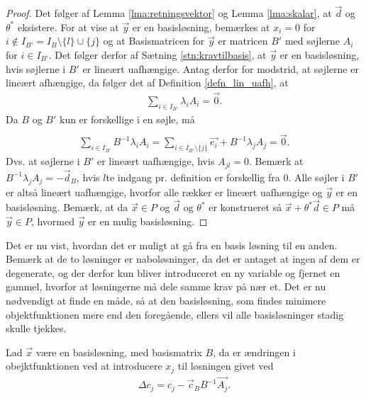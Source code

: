 \begin{proof}
Det følger af Lemma \ref{lma:retningsvektor} og Lemma \ref{lma:skalar}, at $\vec{d}$ og $\theta^*$ eksistere. 
For at vise at $\vec{y}$ er en basisløsning, bemærkes at $x_i = 0$ for $i \notin I_{B'} = I_B\setminus\{l\}\cup\{j\}$ og at Basismatricen for $\vec{y}$ er matricen $B'$ med søjlerne $A_i$ for $i \in I_{B'}$. 
Det følger derfor af Sætning \ref{stn:kravtilbasis},
at $\vec{y}$ er en basisløsning, hvis søjlerne i $B'$ er lineært uafhængige.
Antag derfor for modstrid, at søjlerne er lineært afhængige, da følger det af Definition \ref{defn_lin_uafh},
at
\begin{align*}
 \sum_{i \in I_{B'}} \lambda_i A_i = \vec{0}.
\end{align*}
Da $B$ og $B'$ kun er forskellige i en søjle, må
\begin{align*}
 \\ \sum_{i \in I_{B'}}  B^{-1} \lambda_i A_i  =\sum_{i \in I_{B'}\setminus \{j\}} \vec{e_i} + B^{-1} \lambda_j A_j = \vec{0}.
\end{align*}
Dvs. at søjlerne i $B'$ er lineært uafhængige, hvis $A_{jl} = 0$.
Bemærk at $B^{-1} \lambda_j A_j = - \vec{d}_B$, hvis $l$te indgang pr. definition er forskellig fra $0$. 
Alle søjler i $B'$ er altså lineært uafhængige, hvorfor alle rækker er lineært uafhængige og $\vec{y}$ er en basisløsning.
Bemærk, at da $\vec{x}\in P$ og $\vec{d}$ og $\theta^*$ er konstrueret så $\vec{x}+\theta^*\vec{d} \in P$ må $\vec{y} \in P$, hvormed $\vec{y}$ er en mulig basisløsning.
\end{proof}
Det er nu vist, hvordan det er muligt at gå fra en basis løsning til en anden.
 Bemærk at de to løsninger er naboløsninger, da det er antaget at ingen af dem er degenerate, og der derfor kun bliver introduceret en ny variable og fjernet en gammel, hvorfor at løsningerne må dele samme krav på nær et. 
Det er nu nødvendigt at finde en måde, så at den basisløsning, som findes minimere objektfunktionen mere end den foregående, ellers vil alle basisløsninger stadig skulle tjekkes. 
\begin{stn}
Lad $\vec{x}$ være en basisløsning, med basismatrix $B$, da er ændringen i obejktfunktionen ved at introducere $x_j$ til løsningen givet ved
\begin{align*}
 \Delta c_j = c_j-\vec{c}_B B^{-1}\vec{A_j}.
\end{align*}
\label{stn:Deltac}
\end{stn}
